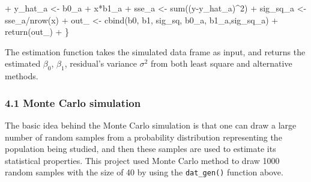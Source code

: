 \documentclass[
]{article}
\newenvironment{Shaded}{\begin{snugshade}}{\end{snugshade}}
\newcommand{\DecValTok}[1]{\textcolor[rgb]{0.00,0.00,0.81}{#1}}
\newcommand{\FunctionTok}[1]{\textcolor[rgb]{0.00,0.00,0.00}{#1}}
\newcommand{\NormalTok}[1]{#1}
\newcommand{\OtherTok}[1]{\textcolor[rgb]{0.56,0.35,0.01}{#1}}
\newcommand{\SpecialCharTok}[1]{\textcolor[rgb]{0.00,0.00,0.00}{#1}}
\begin{document}
\begin{Shaded}
\begin{Highlighting}[]
\SpecialCharTok{+}\NormalTok{   y\_hat\_a }\OtherTok{\textless{}{-}}\NormalTok{ b0\_a }\SpecialCharTok{+}\NormalTok{ x}\SpecialCharTok{*}\NormalTok{b1\_a}
\SpecialCharTok{+}\NormalTok{   sse\_a }\OtherTok{\textless{}{-}} \FunctionTok{sum}\NormalTok{((y}\SpecialCharTok{{-}}\NormalTok{y\_hat\_a)}\SpecialCharTok{\^{}}\DecValTok{2}\NormalTok{)}
\SpecialCharTok{+}\NormalTok{   sig\_sq\_a }\OtherTok{\textless{}{-}}\NormalTok{ sse\_a}\SpecialCharTok{/}\FunctionTok{nrow}\NormalTok{(x)}
\SpecialCharTok{+}\NormalTok{   out\_ }\OtherTok{\textless{}{-}} \FunctionTok{cbind}\NormalTok{(b0, b1, sig\_sq, b0\_a, b1\_a,sig\_sq\_a)}
\SpecialCharTok{+}   \FunctionTok{return}\NormalTok{(out\_)}
\SpecialCharTok{+}\NormalTok{ \}}
\end{Highlighting}
\end{Shaded}

The estimation function takes the simulated data frame as input, and
returns the estimated \(\beta_0\), \(\beta_1\), residual's variance
\(\sigma^2\) from both least square and alternative methods.

\hypertarget{monte-carlo-simulation}{%
\subsubsection{4.1 Monte Carlo
simulation}\label{monte-carlo-simulation}}

The basic idea behind the Monte Carlo simulation is that one can draw a
large number of random samples from a probability distribution
representing the population being studied, and then these samples are
used to estimate its statistical properties. This project used Monte
Carlo method to draw 1000 random samples with the size of 40 by using
the \texttt{dat\_gen()} function above.
\end{document}
